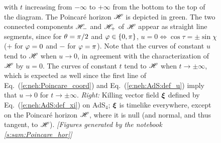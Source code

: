 \begin{figure}
{with $t$ increasing from $-\infty$ to $+\infty$ from the bottom to the top
of the diagram. The Poincaré horizon $\mathscr{H}$ is depicted in green.
The two connected components $\mathscr{H}_-$ and $\mathscr{H}_+$ of $\mathscr{H}$
appear as straight line segments, since for $\theta=\pi/2$
and $\varphi\in\{0,\pi\}$, $u = 0 \iff \cos\tau = \pm \sin\chi$ ($+$ for $\varphi=0$ and $-$ for $\varphi=\pi$).
Note that the curves of constant $u$ tend to $\mathscr{H}$ when $u\to 0$, in agreement
with the characterization of $\mathscr{H}$ by $u=0$. The curves of constant
$t$ tend to $\mathscr{H}$ when $t\to \pm\infty$, which is expected as well since
the first line of Eq.~(\ref{e:neh:Poincare_coord}) and Eq.~(\ref{e:neh:AdS:def_u})
imply that $u\to 0$ for $t\to \pm\infty$.
\emph{Right:} Killing vector field $\bm{\xi}$ defined by Eq.~(\ref{e:neh:AdS:def_xi})
on AdS$_{4}$; $\bm{\xi}$ is timelike everywhere, except on the Poincaré
horizon $\mathscr{H}$, where it is null (and normal, and thus tangent, to $\mathscr{H}$).
\textsl{[Figures generated by the notebook \ref{s:sam:Poincare_hor}]}
}
\end{figure}

